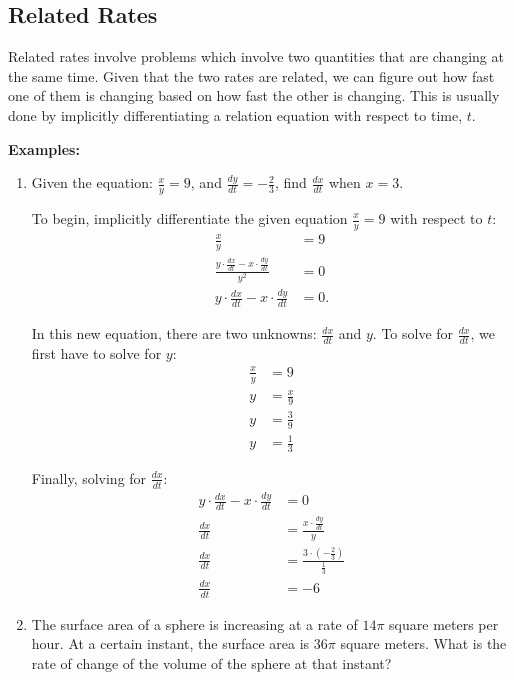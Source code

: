 \documentclass[12pt]{article}
\begin{document}
\subsection{Related Rates}
Related rates involve problems which involve two quantities that are changing at the same time. Given that the two rates are related, we can figure out how fast one of them is changing based on how fast the other is changing. This is usually done by implicitly differentiating a relation equation with respect to time, $t$.

\noindent \textbf{Examples:}
\begin{enumerate}
	\item Given the equation: $\frac{x}{y} = 9$, and $\frac{dy}{dt} = -\frac{2}{3}$, find $\frac{dx}{dt}$ when $x = 3$.

	To begin, implicitly differentiate the given equation $\frac{x}{y} = 9$ with respect to $t$:
	\begin{align*}
		\frac{x}{y} &= 9 \\[5pt]
		\frac{y \cdot \frac{dx}{dt} - x \cdot \frac{dy}{dt}}{y^2} &= 0 \\[5pt]
		y \cdot \frac{dx}{dt} - x \cdot \frac{dy}{dt} &= 0.
	\end{align*}

	In this new equation, there are two unknowns: $\frac{dx}{dt}$ and $y$. To solve for $\frac{dx}{dt}$, we first have to solve for $y$:
	\begin{align*}
		\frac{x}{y} &= 9 \\[5pt]
		y &= \frac{x}{9} \\[5pt]
		y &= \frac{3}{9} \\[5pt]
		y &= \frac{1}{3}
	\end{align*}

	Finally, solving for $\frac{dx}{dt}$:
	\begin{align*}
		y \cdot \frac{dx}{dt} - x \cdot \frac{dy}{dt} &= 0 \\[5pt]
		\frac{dx}{dt} &= \frac{x \cdot \frac{dy}{dt}}{y} \\[5pt]
		\frac{dx}{dt} &= \frac{3 \cdot \left( -\frac{2}{3} \right)}{\frac{1}{3}} \\[5pt]
		\frac{dx}{dt} &= -6
	\end{align*}

	\item The surface area of a sphere is increasing at a rate of $14 \pi$ square meters per hour. At a certain instant, the surface area is $36 \pi$ square meters. What is the rate of change of the volume of the sphere at that instant?


\end{enumerate}
\end{document}
